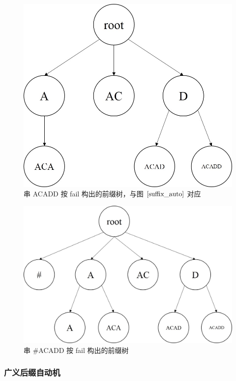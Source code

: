 \documentclass{article}
\begin{document}
\begin{figure}
  \centering
  \includegraphics[scale=0.6]{suffix_auto2.jpg}
  \caption{串 ACADD 按 fail 构出的前缀树，与图 $\ref{suffix_auto}$ 对应}
  \label{suffix_auto2}
\end{figure}


\begin{figure}
  \centering
  \includegraphics[scale=0.6]{suffix_auto3.jpg}
  \caption{串 \#ACADD 按 fail 构出的前缀树}
  \label{suffix_auto3}
\end{figure}

\subsubsection{广义后缀自动机}
\end{document}
